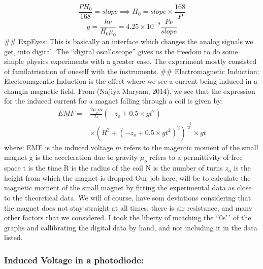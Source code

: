 \documentclass{../_layouts/ieeeconf}
\begin{document}
\begin{equation}\label{key}
    \frac{PH_0}{168}=slope \implies H_0=slope \times \frac{168}{P}
\end{equation} \begin{equation}\label{eq}
g=\frac{h \nu}{H_0 \mu_0} = 4.25\times10^{-9} \frac{P \nu}{slope}
\end{equation} \#\# ExpEyes: This is basically an interface which
changes the analog signals we get, into digital. The ``digital
oscilloscope'' gives us the freedom to do some simple physics
experiments with a greater ease. The experiment mostly consisted of
familatrisation of oneself with the instruments. \#\# Electromagnetic
Induction: Electromagentic Induction is the effect where we see a
current being induced in a changin magnetic field. From (Najiya Maryam,
2014), we see that the expression for the induced current for a magnet
falling through a coil is given by: \begin{align}
    EMF = &\frac{2\mu_o m}{2\pi}(-z_o+0.5\times gt^2) \\ \nonumber
    &\times (R^2+(-z_o+0.5\times gt^2)^2)^\frac{-5}{2}\times gt
\end{align} where: \newline EMF is the induced voltage \newline \(m\)
refers to the magentic moment of the small magnet \newline g is the
acceleration due to gravity \newline \(\mu_o\) refers to a permittivity
of free space \newline t is the time \newline R is the radius of the
coil \newline N is the number of turns \newline \(z_o\) is the height
from which the magnet is dropped Our job here, will be to calculate the
magnetic moment of the small magnet by fitting the experimental data as
close to the theoretical data. We will of course, have som deviations
considering that the magnet does not stay straight at all times, there
is air resistance, and many other factors that we considered. I took the
liberty of matching the ``0s'\,' of the graphs and callibrating the
digital data by hand, and not including it in the data listed.

\subsubsection{Induced Voltage in a photodiode:}
\end{document}
